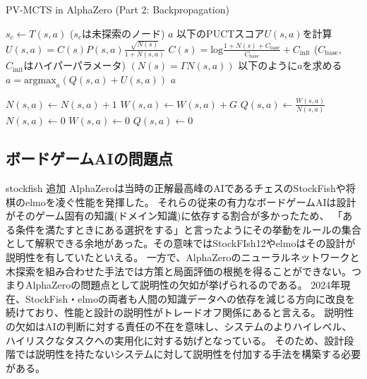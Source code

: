 \begin{algorithm}
    \caption{PV-MCTS in AlphaZero (Part 2: Backpropagation)}
    \label{alg:mcts-2}
    \begin{algorithmic}[1]
                \State $s_c \gets T(s, a)$ ($s_c$は未探索のノード)
                \State {}
                \State \Return $a$
            \Else
                \State 以下のPUCTスコア$U(s, a)$を計算
                \State $U(s, a)= C(s)P(s, a)\frac{\sqrt{N(s)}}{1+N(s, a)}$
                \State $C(s)=\textrm{log}\frac{1+N(s)+C_{\textrm{base}}}{C_{\textrm{base}}}+C_{\textrm{init}}$
                \State($C_{\textrm{base}}$, $C_{\textrm{init}}$はハイパーパラメータ)
                \State $(N(s)=\Gamma N(s, a))$
                \State 以下のように$a$を求める
                \State $a = {\textrm{argmax}}_a (Q(s, a)+U(s, a))$
                \State \Return $a$
                
            \EndIf
        \EndFunction
                \State $N(s, a) \gets  N(s, a)+1$
                \State $W(s, a) \gets  W(s, a)+G$
                \State $Q(s, a) \gets \frac{W(s, a)}{N(s, a)}$
            \EndFor
        \EndFunction
                \State $N(s, a) \gets 0$
                \State $W(s, a) \gets 0$
                \State $Q(s, a) \gets 0$
            \EndFor
        \EndFunction
    \end{algorithmic}
\end{algorithm}


\subsection{ボードゲームAIの問題点}
stockfish 追加
AlphaZeroは当時の正解最高峰のAIであるチェスのStockFish\cite{StockFish}や将棋のelmo\cite{elmo}を凌ぐ性能を発揮した。
それらの従来の有力なボードゲームAIは設計がそのゲーム固有の知識(ドメイン知識)に依存する割合が多かったため、
「ある条件を満たすときにある選択をする」と言ったようにその挙動をルールの集合として解釈できる余地があった。その意味ではStockFIsh12やelmoはその設計が説明性を有していたといえる。
一方で、AlphaZeroのニューラルネットワークと木探索を組み合わせた手法では方策と局面評価の根拠を得ることができない。つまりAlphaZeroの問題点として説明性の欠如が挙げられるのである。
2024年現在、StockFish・elmoの両者も人間の知識データへの依存を減じる方向に改良を続けており、性能と設計の説明性がトレードオフ関係にあると言える\cite{elmo}\cite{StockFish13}。
説明性の欠如はAIの判断に対する責任の不在を意味し、システムのよりハイレベル、ハイリスクなタスクへの実用化に対する妨げとなっている。
そのため、設計段階では説明性を持たないシステムに対して説明性を付加する手法を構築する必要がある。




